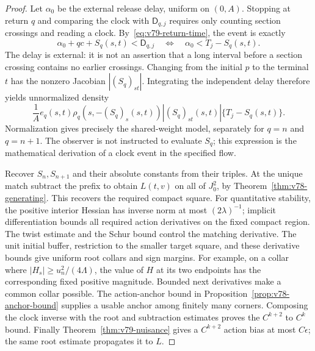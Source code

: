 \begin{proof}
Let $\alpha_0$ be the external release delay, uniform on $(0,A)$.
Stopping at return $q$ and comparing the clock with $\mathsf D_{q,j}$
requires only counting section crossings and reading a clock.
By~\eqref{eq:v79-return-time}, the event is exactly
\[
           \alpha_0+qc+S_q(s,t)<\mathsf D_{q,j}
               \quad\Longleftrightarrow\quad
                    \alpha_0<T_j-S_q(s,t).
\]
The delay is external: it is not an assertion that a long interval
before a section crossing contains no earlier crossings.  Changing
from the initial $p$ to the terminal $t$ has the nonzero Jacobian
$|(S_q)_{st}|$.  Integrating the independent delay therefore yields
unnormalized density
\[
 \frac1A e_q(s,t)\rho_q(s,-(S_q)_s(s,t))
             |(S_q)_{st}(s,t)|\{T_j-S_q(s,t)\}.
\]
Normalization gives precisely the shared-weight model, separately
for $q=n$ and $q=n+1$.  The observer is not instructed to evaluate
$S_q$; this expression is the mathematical derivation of a clock event
in the specified flow.

Recover $S_n,S_{n+1}$ and their absolute constants from their triples.
At the unique match subtract the prefix to obtain $L(t,v)$ on all of
$J_0^2$, by Theorem~\ref{thm:v78-generating}.  This recovers the
required compact square.  For quantitative stability, the positive
interior Hessian has inverse norm at most $(2\lambda)^{-1}$;
implicit differentiation bounds all required action derivatives on
the fixed compact region.  The twist estimate and the Schur bound
control the matching derivative.  The unit initial buffer, restriction
to the smaller target square, and these derivative bounds give uniform
root collars and sign margins.  For example, on a collar where
$|H_s|\ge u_n^2/(4\Lambda)$, the value of $H$ at its two endpoints
has the corresponding fixed positive magnitude.  Bounded next
derivatives make a common collar possible.  The action-anchor bound
in Proposition~\ref{prop:v78-anchor-bound} supplies a usable anchor
among finitely many corners.  Composing the clock inverse with the
root and subtraction estimates proves the $C^{k+2}$ to $C^k$ bound.
Finally Theorem~\ref{thm:v79-nuisance} gives a $C^{k+2}$ action bias
at most $C\epsilon$; the same root estimate propagates it to $L$.
\end{proof}

